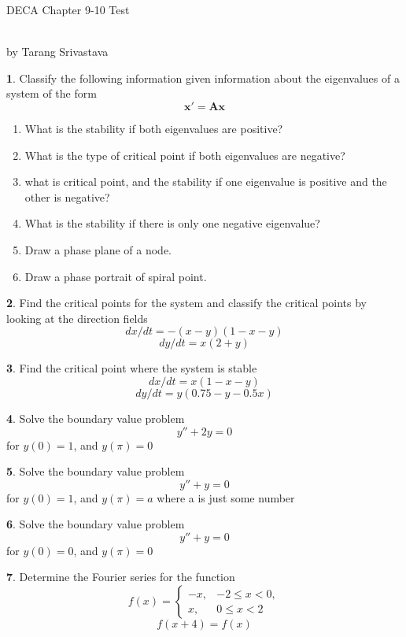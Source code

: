 \documentclass[11pt]{article}
\author{Tarang Srivastava}
\newcommand{\makechaptertitle}[1]{
\begin{center}
	\begin{large}
		DECA Chapter #1 Test
	\end{large}
	\begin{small}
		\\by Tarang Srivastava
	\end{small}
\end{center}
}
\theoremstyle{definition}
\newtheorem{q}{}
\begin{document}
	\begin{multicols*}{2}
		\makechaptertitle{9-10}
		\begin{q}
			Classify the following information given information about the eigenvalues of a system of the form \[ \textbf{x}' = \textbf{Ax} \]
			\begin{enumerate}
				\item What is the stability if both eigenvalues are positive?
				\item What is the type of critical point if both eigenvalues are negative?
				\item what is critical point, and the stability if one eigenvalue is positive and the other is negative? 
				\item What is the stability if there is only one negative eigenvalue? 
				\item Draw a phase plane of a node. 
				\item Draw a phase portrait of spiral point. 
			\end{enumerate} 
		\end{q}
		\begin{q}
			Find the critical points for the system and classify the critical points by looking at the direction fields
			\[ dx/dt = -(x-y)(1-x-y) \] \[ dy/dt = x(2+y) \]
		\end{q}
		\begin{q}
			Find the critical point where the system is stable 
			\[ dx/dt = x(1-x-y) \]
			\[ dy/dt = y(0.75 - y - 0.5x) \]
		\end{q}
		\begin{q}
			Solve the boundary value problem 
			\[ y'' + 2y = 0 \]
			for $ y(0) = 1 $, and $ y(\pi) = 0 $
		\end{q}
		\begin{q}
			Solve the boundary value problem 
			\[ y'' + y = 0 \]
			for $ y(0) = 1 $, and $ y(\pi) = a $ where a is just some number
		\end{q}
		\begin{q}
			Solve the boundary value problem 
			\[ y'' + y = 0 \]
			for $ y(0) = 0 $, and $ y(\pi) = 0 $
		\end{q}
		\begin{q}
			Determine the Fourier series for the function 
			\[ f(x) = \begin{cases}
				-x, & -2 \leq x < 0, \\
				x, & 0 \leq x < 2
			\end{cases} \]
			\[ f(x+4) = f(x) \]
		\end{q}
	\end{multicols*}
\end{document}
